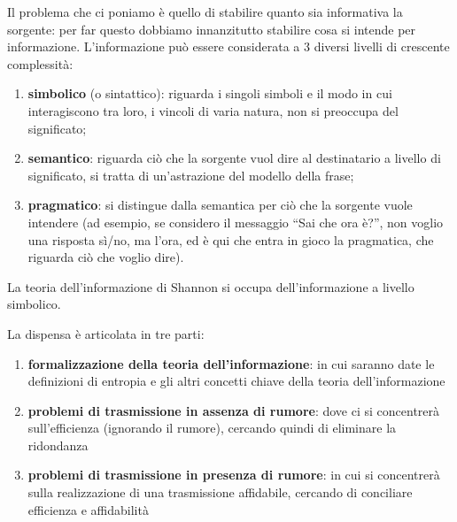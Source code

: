Il problema che ci poniamo è quello di stabilire quanto sia informativa la sorgente: per far questo dobbiamo innanzitutto stabilire cosa si intende per informazione. L'informazione può essere considerata a 3 diversi livelli di crescente complessità:
\begin{enumerate}
\item \textbf{simbolico} (o sintattico): riguarda i singoli simboli e il modo in cui interagiscono tra loro, i vincoli di varia natura, non si preoccupa del significato;
\item \textbf{semantico}: riguarda ciò che la sorgente vuol dire al destinatario a livello di significato, si tratta di un'astrazione del modello della frase;
\item \textbf{pragmatico}: si distingue dalla semantica per ciò che la sorgente vuole intendere (ad esempio, se considero il messaggio ``Sai che ora è?'', non voglio una risposta sì/no, ma l'ora, ed è qui che entra in gioco la pragmatica, che riguarda ciò che voglio dire).
\end{enumerate}

\noindent
La teoria dell'informazione di Shannon si occupa dell'informazione a livello simbolico.

\medskip
\noindent
La dispensa è articolata in tre parti:
\begin{enumerate}
\item \textbf{formalizzazione della teoria dell'informazione}: in cui saranno date le definizioni di entropia e gli altri concetti chiave della teoria dell'informazione
\item \textbf{problemi di trasmissione in assenza di rumore}: dove ci si concentrerà sull'efficienza (ignorando il rumore), cercando quindi di eliminare la ridondanza
\item \textbf{problemi di trasmissione in presenza di rumore}: in cui si concentrerà sulla realizzazione di una trasmissione affidabile, cercando di conciliare efficienza e affidabilità
\end{enumerate}